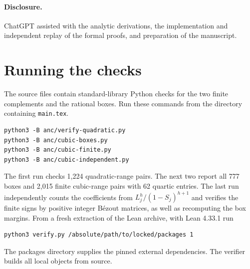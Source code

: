 \documentclass[11pt]{article}
\begin{document}
\paragraph{Disclosure.}
ChatGPT assisted with the analytic derivations, the implementation and
independent replay of the formal proofs, and preparation of the manuscript.

\appendix
\section{Running the checks}
The source files contain standard-library Python checks for the two finite
complements and the rational boxes. Run these commands from the directory
containing \texttt{main.tex}.
\begin{verbatim}
python3 -B anc/verify-quadratic.py
python3 -B anc/cubic-boxes.py
python3 -B anc/cubic-finite.py
python3 -B anc/cubic-independent.py
\end{verbatim}
The first run checks 1,224 quadratic-range pairs. The next two report all
777 boxes and 2,015 finite cubic-range pairs with 62 quartic entries.
The last run independently counts the coefficients from
\(L_j^h/(1-S_j)^{h+1}\) and verifies the finite signs by positive integer
B\'ezout matrices, as well as recomputing the box margins.
From a fresh extraction of the Lean archive, with Lean 4.33.1 run
\begin{verbatim}
python3 verify.py /absolute/path/to/locked/packages 1
\end{verbatim}
The packages directory supplies the pinned external dependencies.
The verifier builds all local objects from source.
\end{document}
